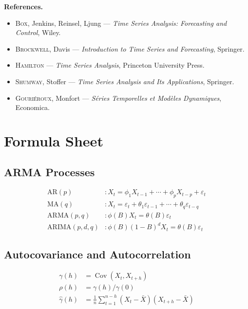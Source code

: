 \documentclass[12pt,a4paper,twoside]{book}
\theoremstyle{definition}
\theoremstyle{plain}
\theoremstyle{remark}
\newcommand{\Cov}{\operatorname{Cov}}
\newcommand{\eps}{\varepsilon}
\begin{document}
\medskip
\textbf{References.}
\begin{itemize}
\item \textsc{Box}, Jenkins, Reinsel, Ljung --- \emph{Time Series Analysis: Forecasting and Control}, Wiley.
\item \textsc{Brockwell}, Davis --- \emph{Introduction to Time Series and Forecasting}, Springer.
\item \textsc{Hamilton} --- \emph{Time Series Analysis}, Princeton University Press.
\item \textsc{Shumway}, Stoffer --- \emph{Time Series Analysis and Its Applications}, Springer.
\item \textsc{Gouri\'eroux}, Monfort --- \emph{S\'eries Temporelles et Mod\`eles Dynamiques}, Economica.
\end{itemize}

\mainmatter













\backmatter
\appendix
\chapter{Formula Sheet}
\label{app:formulas}

\section{ARMA Processes}
\begin{align}
\text{AR}(p) &: X_t = \phi_1 X_{t-1}+\cdots+\phi_p X_{t-p}+\eps_t \\
\text{MA}(q) &: X_t = \eps_t+\theta_1\eps_{t-1}+\cdots+\theta_q\eps_{t-q} \\
\text{ARMA}(p,q) &: \phi(B)X_t = \theta(B)\eps_t \\
\text{ARIMA}(p,d,q) &: \phi(B)(1-B)^d X_t = \theta(B)\eps_t
\end{align}

\section{Autocovariance and Autocorrelation}
\begin{align}
\gamma(h) &= \Cov(X_t,X_{t+h}) \\
\rho(h) &= \gamma(h)/\gamma(0) \\
\hat{\gamma}(h) &= \frac{1}{n}\sum_{t=1}^{n-h}(X_t-\bar{X})(X_{t+h}-\bar{X})
\end{align}
\end{document}
